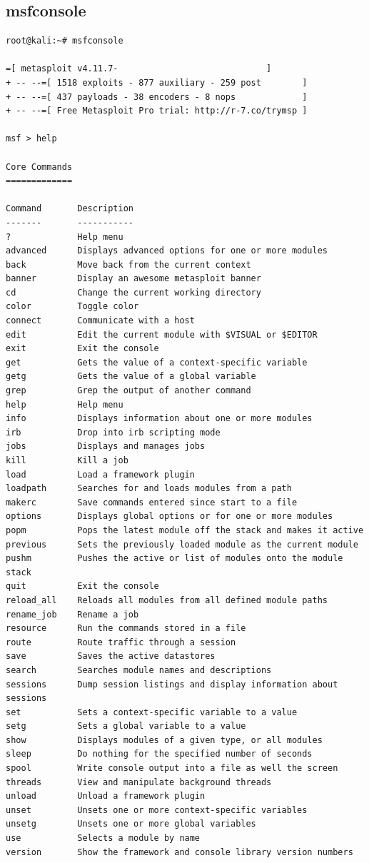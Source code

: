 \subsection{msfconsole}
\begin{lstlisting}
root@kali:~# msfconsole 

=[ metasploit v4.11.7-                             ]
+ -- --=[ 1518 exploits - 877 auxiliary - 259 post        ]
+ -- --=[ 437 payloads - 38 encoders - 8 nops             ]
+ -- --=[ Free Metasploit Pro trial: http://r-7.co/trymsp ]

msf > help

Core Commands
=============

Command       Description
-------       -----------
?             Help menu
advanced      Displays advanced options for one or more modules
back          Move back from the current context
banner        Display an awesome metasploit banner
cd            Change the current working directory
color         Toggle color
connect       Communicate with a host
edit          Edit the current module with $VISUAL or $EDITOR
exit          Exit the console
get           Gets the value of a context-specific variable
getg          Gets the value of a global variable
grep          Grep the output of another command
help          Help menu
info          Displays information about one or more modules
irb           Drop into irb scripting mode
jobs          Displays and manages jobs
kill          Kill a job
load          Load a framework plugin
loadpath      Searches for and loads modules from a path
makerc        Save commands entered since start to a file
options       Displays global options or for one or more modules
popm          Pops the latest module off the stack and makes it active
previous      Sets the previously loaded module as the current module
pushm         Pushes the active or list of modules onto the module stack
quit          Exit the console
reload_all    Reloads all modules from all defined module paths
rename_job    Rename a job
resource      Run the commands stored in a file
route         Route traffic through a session
save          Saves the active datastores
search        Searches module names and descriptions
sessions      Dump session listings and display information about sessions
set           Sets a context-specific variable to a value
setg          Sets a global variable to a value
show          Displays modules of a given type, or all modules
sleep         Do nothing for the specified number of seconds
spool         Write console output into a file as well the screen
threads       View and manipulate background threads
unload        Unload a framework plugin
unset         Unsets one or more context-specific variables
unsetg        Unsets one or more global variables
use           Selects a module by name
version       Show the framework and console library version numbers



\end{lstlisting}
